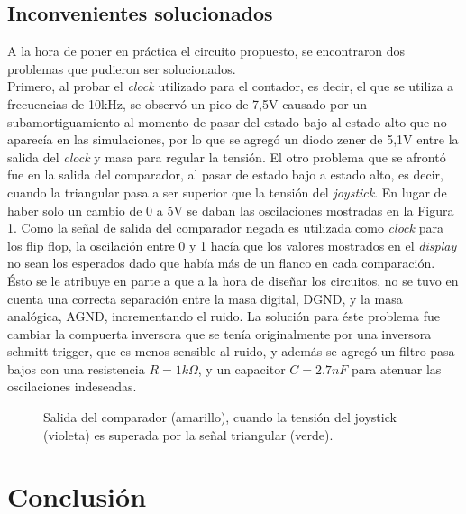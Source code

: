 \documentclass[11pt, a4paper]{article}
\begin{document}
\subsection{Inconvenientes solucionados}
A la hora de poner en pr\'actica el circuito propuesto, se encontraron dos problemas que pudieron ser solucionados.\\
Primero, al probar el \textit{clock} utilizado para el contador, es decir, el que se utiliza a frecuencias de 10kHz, se observ\'o un pico de 7,5V causado por un subamortiguamiento al momento de pasar del estado bajo al estado alto que no aparec\'ia en las simulaciones, por lo que se agreg\'o un diodo zener de 5,1V entre la salida del \textit{clock} y masa para regular la tensi\'on.\newline
El otro problema que se afront\'o fue en la salida del comparador, al pasar de estado bajo a estado alto, es decir, cuando la triangular pasa a ser superior que la tensi\'on del \textit{joystick}. En lugar de haber solo un cambio de 0 a 5V se daban las oscilaciones mostradas en la Figura \ref{fig:salida_comp}. Como la se\~nal de salida del comparador negada es utilizada como \textit{clock} para los flip flop, la oscilaci\'on entre 0 y 1 hac\'ia que los valores mostrados en el \textit{display} no sean los esperados dado que hab\'ia m\'as de un flanco en cada comparaci\'on. \'Esto se le atribuye en parte a que a la hora de dise\~nar los circuitos, no se tuvo en cuenta una correcta separaci\'on entre la masa digital, DGND, y la masa anal\'ogica, AGND, incrementando el ruido. La soluci\'on para \'este problema fue cambiar la compuerta inversora que se ten\'ia originalmente por una inversora schmitt trigger, que es menos sensible al ruido, y adem\'as se agreg\'o un filtro pasa bajos con una resistencia $R=1k\Omega$, y un capacitor $C=2.7nF$ para atenuar las oscilaciones indeseadas.
%
\begin{figure}[H]
	\centering
	\caption{Salida del comparador (amarillo), cuando la tensi\'on del joystick (violeta) es superada por la señal triangular (verde).}
	\label{fig:salida_comp}
\end{figure}
%
\newpage
\section{Conclusi\'on}
\end{document}
